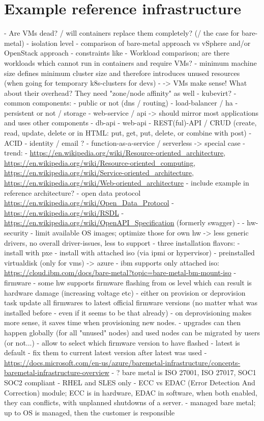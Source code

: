 \section{Example reference infrastructure} %
- Are VMs dead? / will containers replace them completely? (/ the case for bare-metal)
  - isolation level
  - comparison of bare-metal approach vs vSphere and/or OpenStack approach
  - constraints like
    - Workload comparison; are there workloads which cannot run in containers and require VMs?
    - minimum machine size defines minimum cluster size and therefore introduces unused resources (when going for temporary k8s-clusters for devs)
  - -> VMs make sense! What about their overhead? They need "zone/node affinity" as well
  - kubevirt?
- common components:
  - public or not (dns / routing)
  - load-balancer / ha
  - persistent or not / storage
  - web-service / api -> should mirror most applications and uses other components
    - db-api
    - web-api
    - REST(ful)-API / CRUD (create, read, update, delete or in HTML: put, get, put, delete, or combine with post)
    - ACID
  - identity / email ?
  - function-as-a-service / serverless -> special case
  - trend:
    - \url{https://en.wikipedia.org/wiki/Resource-oriented_architecture}, \url{https://en.wikipedia.org/wiki/Resource-oriented_computing}, \url{https://en.wikipedia.org/wiki/Service-oriented_architecture}, \url{https://en.wikipedia.org/wiki/Web-oriented_architecture}
    - include example in reference architecture?
    - open data protocol \url{https://en.wikipedia.org/wiki/Open_Data_Protocol}
    - \url{https://en.wikipedia.org/wiki/RSDL}
    - \url{https://en.wikipedia.org/wiki/OpenAPI_Specification} (formerly swagger)
- %
- hw-security
  - limit available OS images; optimize those for own hw -> less generic drivers, no overall driver-issues, less to support
  - three installation flavors:
    - install with pxe
    - install with attached iso (via ipmi or hypervisor)
    - preinstalled virtualdisk (only for vms) -> azure
    - ibm supports only attached iso: \url{https://cloud.ibm.com/docs/bare-metal?topic=bare-metal-bm-mount-iso}
  - firmware
    - some hw supports firmware flashing from os level which can result is hardware damage (increasing voltage etc)
    - either on provision or deprovision task update all firmwares to latest official firmware versions (no matter what was installed before - even if it seems to be that already)
      - on deprovisioning makes more sense, it saves time when provisioning new nodes.
    - upgrades can then happen globally (for all "unused" nodes) and used nodes can be migrated by users (or not...)
    - allow to select which firmware version to have flashed
      - latest is default
      - fix them to current latest version after latest was used
  - \url{https://docs.microsoft.com/en-us/azure/baremetal-infrastructure/concepts-baremetal-infrastructure-overview}
    - ? bare metal is ISO 27001, ISO 27017, SOC1 SOC2 compliant
    - RHEL and SLES only
    - ECC vs EDAC (Error Detection And Correction) module; ECC is in hardware, EDAC in software, when both enabled, they can conflicts, with unplanned shutdowns of a server.
    - managed bare metal; up to OS is managed, then the customer is responsible

